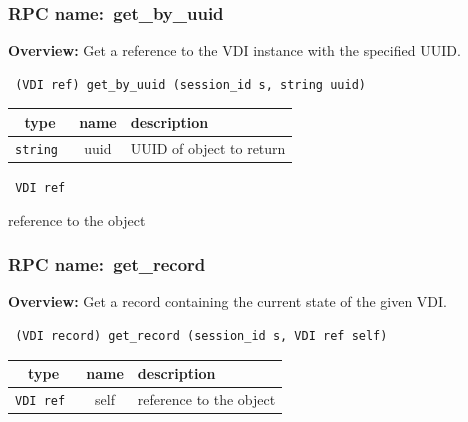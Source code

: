 \subsubsection{RPC name:~get\_by\_uuid}

{\bf Overview:} 
Get a reference to the VDI instance with the specified UUID.

\begin{verbatim} (VDI ref) get_by_uuid (session_id s, string uuid)\end{verbatim}



 
\vspace{0.3cm}
\begin{tabular}{|c|c|p{7cm}|}
 \hline
{\bf type} & {\bf name} & {\bf description} \\ \hline
{\tt string } & uuid & UUID of object to return \\ \hline 

\end{tabular}

\vspace{0.3cm}

{\tt 
VDI ref
}


reference to the object
\vspace{0.3cm}
\vspace{0.3cm}
\vspace{0.3cm}
\subsubsection{RPC name:~get\_record}

{\bf Overview:} 
Get a record containing the current state of the given VDI.

\begin{verbatim} (VDI record) get_record (session_id s, VDI ref self)\end{verbatim}



 
\vspace{0.3cm}
\begin{tabular}{|c|c|p{7cm}|}
 \hline
{\bf type} & {\bf name} & {\bf description} \\ \hline
{\tt VDI ref } & self & reference to the object \\ \hline 

\end{tabular}

